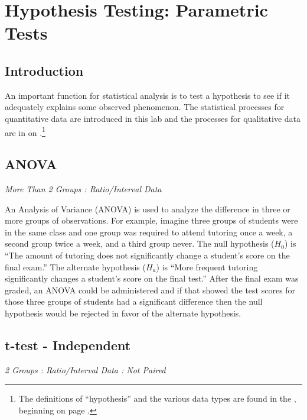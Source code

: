 \chapter{Hypothesis Testing: Parametric Tests}\label{hyp:parametric}
\section{Introduction}

An important function for statistical analysis is to test a hypothesis to see if it adequately explains some observed phenomenon. The statistical processes for quantitative data are introduced in this lab and the processes for qualitative data are in  on \pageref{hyp:nonparametric}.\footnote{The definitions of ``hypothesis'' and the various data types are found in the , beginning on page \pageref{intro:Hypothesis}.} 

\section{ANOVA}

\textit{More Than 2 Groups : Ratio/Interval Data}

An Analysis of Variance (ANOVA) is used to analyze the difference in three or more groups of observations. For example, imagine three groups of students were in the same class and one group was required to attend tutoring once a week, a second group twice a week, and a third group never. The null hypothesis ($ H_{0} $) is ``The amount of tutoring does not significantly change a student's score on the final exam.'' The alternate hypothesis ($ H_{a} $) is ``More frequent tutoring significantly changes a student's score on the final test.'' After the final exam was graded, an ANOVA could be administered and if that showed the test scores for those three groups of students had a significant difference then the null hypothesis would be rejected in favor of the alternate hypothesis.

\section{t-test - Independent} 

\textit{2 Groups : Ratio/Interval Data : Not Paired}

